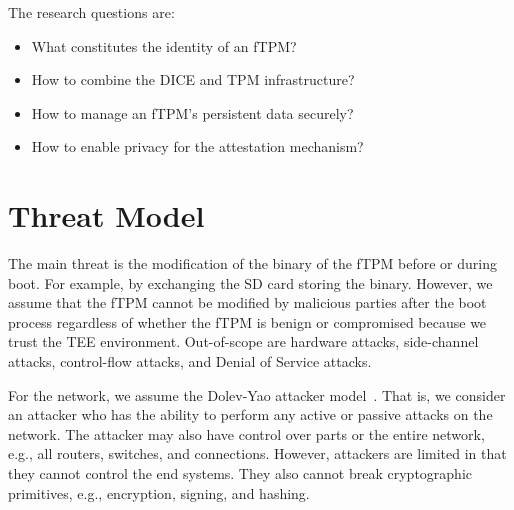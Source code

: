 
The research questions are:
\begin{itemize}
  \item What constitutes the identity of an fTPM\@? %
  \item How to combine the DICE and TPM infrastructure? %
  \item How to manage an fTPM's persistent data securely? %
  \item How to enable privacy for the attestation mechanism?
\end{itemize}



\section{Threat Model}



The main threat is the modification of the binary of the fTPM before or during boot. For example, by exchanging the SD card storing the binary.
However, we assume that the fTPM cannot be modified by malicious parties after the boot process regardless of whether the fTPM is benign or compromised because we trust the TEE environment.
Out-of-scope are hardware attacks, side-channel attacks, control-flow attacks, and Denial of Service attacks.

For the network, we assume the Dolev-Yao attacker model~\cite{Dolev1983}. That is, we consider an attacker who has the ability to perform any active or passive attacks on the network. The attacker may also have control over parts or the entire network, e.g., all routers, switches, and connections. However, attackers are limited in that they cannot control the end systems. They also cannot break cryptographic primitives, e.g., encryption, signing, and hashing.

